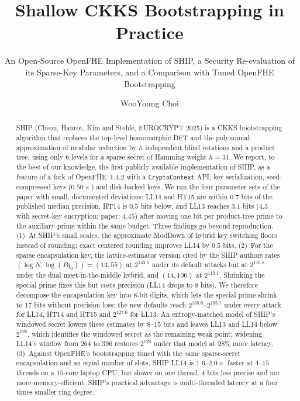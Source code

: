 \documentclass[sigconf,nonacm]{acmart}
\begin{document}
\title{Shallow CKKS Bootstrapping in Practice}
\subtitle{An Open-Source OpenFHE Implementation of SHIP, a Security Re-evaluation of its Sparse-Key Parameters, and a Comparison with Tuned OpenFHE Bootstrapping}

\author{WooYoung Choi}

\begin{abstract}
SHIP (Cheon, Hanrot, Kim and Stehl\'e, EUROCRYPT 2025) is a CKKS bootstrapping algorithm that replaces the top-level homomorphic DFT and the polynomial approximation of modular reduction by $h$ independent blind rotations and a product tree, using only $6$ levels for a sparse secret of Hamming weight $h=31$.
We report, to the best of our knowledge, the first publicly available implementation of SHIP, as a feature of a fork of OpenFHE~1.4.2 with a \texttt{CryptoContext} API, key serialization, seed-compressed keys ($0.50\times$) and disk-backed keys.
We run the four parameter sets of the paper with small, documented deviations: LL14 and HT15 are within $0.7$ bits of the published median precision, HT14 is $0.5$ bits below, and LL13 reaches $3.1$ bits ($4.3$ with secret-key encryption; paper: $4.45$) after moving one bit per product-tree prime to the auxiliary prime within the same budget.
Three findings go beyond reproduction.
(1)~At SHIP's small scales, the approximate ModDown of hybrid key switching floors instead of rounding; exact centered rounding improves LL14 by $0.5$ bits.
(2)~For the sparse encapsulation key, the lattice-estimator version cited by the SHIP authors rates $(\log N,\log(Pq_0))=(13,55)$ at $2^{143.6}$ under its default attacks but at $2^{116.8}$ under the dual meet-in-the-middle hybrid, and $(14,100)$ at $2^{119.1}$. Shrinking the special prime fixes this but costs precision (LL14 drops to $8$ bits). We therefore decompose the encapsulation key into $8$-bit digits, which lets the special prime shrink to $17$ bits without precision loss: the new defaults reach $2^{135.6}$--$2^{155.7}$ under every attack for LL14, HT14 and HT15 and $2^{127.6}$ for LL13. An entropy-matched model of SHIP's windowed secret lowers these estimates by $8$--$15$ bits and leaves LL13 and LL14 below $2^{128}$, which identifies the windowed secret as the remaining weak point; widening LL14's window from $264$ to $396$ restores $2^{128}$ under that model at $28\%$ more latency.
(3)~Against OpenFHE's bootstrapping tuned with the same sparse-secret encapsulation and an equal number of slots, SHIP LL14 is $1.6$--$2.0\times$ faster at $4$--$15$ threads on a $15$-core laptop CPU, but slower on one thread, $4$ bits less precise and not more memory-efficient.
SHIP's practical advantage is multi-threaded latency at a four times smaller ring degree.
\end{abstract}
\end{document}
